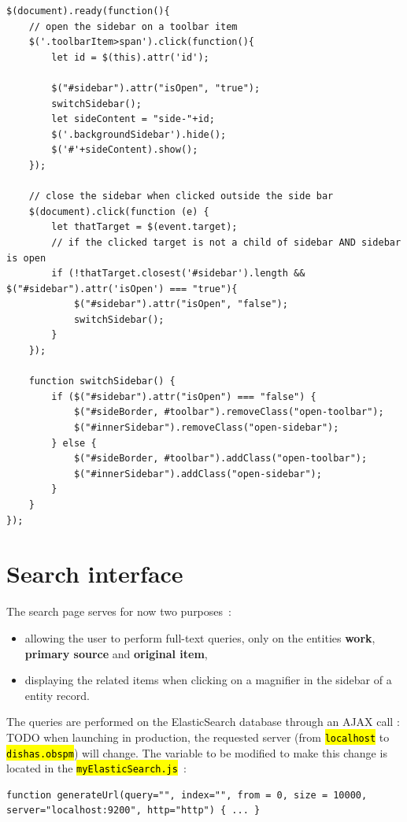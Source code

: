 \documentclass[a4paper,12pt,twoside]{book}
\let\OldTexttt\texttt
\renewcommand{\texttt}[1]{\OldTexttt{\hl{#1}}}
\begin{document}
\begin{lstlisting}
$(document).ready(function(){
    // open the sidebar on a toolbar item
    $('.toolbarItem>span').click(function(){
        let id = $(this).attr('id');

        $("#sidebar").attr("isOpen", "true");
        switchSidebar();
        let sideContent = "side-"+id;
        $('.backgroundSidebar').hide();
        $('#'+sideContent).show();
    });

    // close the sidebar when clicked outside the side bar
    $(document).click(function (e) {
        let thatTarget = $(event.target);
        // if the clicked target is not a child of sidebar AND sidebar is open
        if (!thatTarget.closest('#sidebar').length && $("#sidebar").attr('isOpen') === "true"){
            $("#sidebar").attr("isOpen", "false");
            switchSidebar();
        }
    });

    function switchSidebar() {
        if ($("#sidebar").attr("isOpen") === "false") {
            $("#sideBorder, #toolbar").removeClass("open-toolbar");
            $("#innerSidebar").removeClass("open-sidebar");
        } else {
            $("#sideBorder, #toolbar").addClass("open-toolbar");
            $("#innerSidebar").addClass("open-sidebar");
        }
    }
});
\end{lstlisting}

		\section{Search interface}\label{search-interface}

The search page serves for now two purposes~:
\begin{itemize}
	\item allowing the user to perform full-text queries, only on the entities \textbf{work}, \textbf{primary source} and \textbf{original item},
	\item displaying the related items when clicking on a magnifier in the sidebar of a entity record.
\end{itemize}

The queries are performed on the ElasticSearch database through an AJAX call : TODO when launching in production, the requested server (from \texttt{localhost} to \texttt{dishas.obspm}) will change. The variable to be modified to make this change is located in the \texttt{myElasticSearch.js}~:

\begin{lstlisting}
function generateUrl(query="", index="", from = 0, size = 10000, server="localhost:9200", http="http") { ... }
\end{lstlisting}
\end{document}
